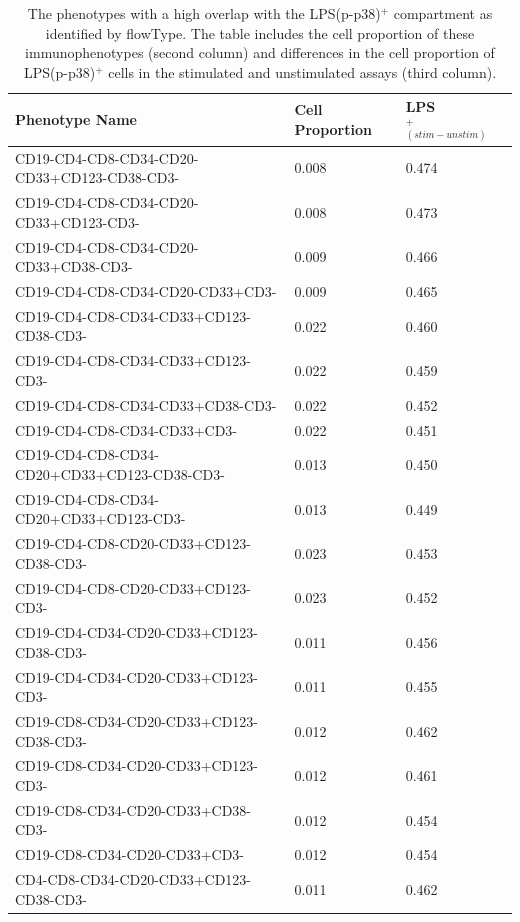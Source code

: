 \begin{table}[ht]\footnotesize
  \begin{center}
    \caption{The phenotypes with a high overlap with the LPS(p-p38)$^+$ compartment as identified by flowType. The table includes the cell proportion of these immunophenotypes (second column) and differences in the cell proportion of LPS(p-p38)$^+$ cells in the stimulated and unstimulated assays (third column).}
    \label{LPS}
    \begin{tabular}{lll}
      \hline
      Phenotype Name & Cell Proportion & LPS$^+_{(stim-unstim)}$ \\ 
      \hline
      CD19-CD4-CD8-CD34-CD20-CD33+CD123-CD38-CD3- & 0.008 & 0.474 \\ 
      CD19-CD4-CD8-CD34-CD20-CD33+CD123-CD3- & 0.008 & 0.473 \\ 
      CD19-CD4-CD8-CD34-CD20-CD33+CD38-CD3- & 0.009 & 0.466 \\ 
      CD19-CD4-CD8-CD34-CD20-CD33+CD3- & 0.009 & 0.465 \\ 
      CD19-CD4-CD8-CD34-CD33+CD123-CD38-CD3- & 0.022 & 0.460 \\ 
      CD19-CD4-CD8-CD34-CD33+CD123-CD3- & 0.022 & 0.459 \\ 
      CD19-CD4-CD8-CD34-CD33+CD38-CD3- & 0.022 & 0.452 \\ 
      CD19-CD4-CD8-CD34-CD33+CD3- & 0.022 & 0.451 \\ 
      CD19-CD4-CD8-CD34-CD20+CD33+CD123-CD38-CD3- & 0.013 & 0.450 \\ 
      CD19-CD4-CD8-CD34-CD20+CD33+CD123-CD3- & 0.013 & 0.449 \\ 
      CD19-CD4-CD8-CD20-CD33+CD123-CD38-CD3- & 0.023 & 0.453 \\ 
      CD19-CD4-CD8-CD20-CD33+CD123-CD3- & 0.023 & 0.452 \\ 
      CD19-CD4-CD34-CD20-CD33+CD123-CD38-CD3- & 0.011 & 0.456 \\ 
      CD19-CD4-CD34-CD20-CD33+CD123-CD3- & 0.011 & 0.455 \\ 
      CD19-CD8-CD34-CD20-CD33+CD123-CD38-CD3- & 0.012 & 0.462 \\ 
      CD19-CD8-CD34-CD20-CD33+CD123-CD3- & 0.012 & 0.461 \\ 
      CD19-CD8-CD34-CD20-CD33+CD38-CD3- & 0.012 & 0.454 \\ 
      CD19-CD8-CD34-CD20-CD33+CD3- & 0.012 & 0.454 \\ 
      CD4-CD8-CD34-CD20-CD33+CD123-CD38-CD3- & 0.011 & 0.462 \\ 

\end{tabular}
\end{center}
\end{table}
